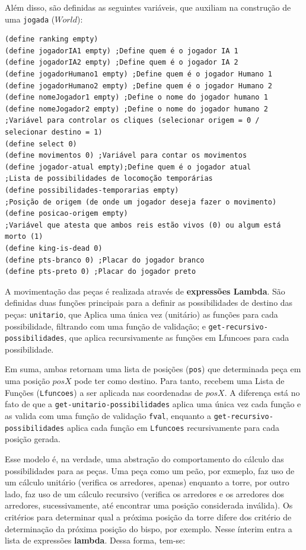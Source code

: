 Além disso, são definidas as seguintes variáveis, que auxiliam na construção de uma \verb|jogada| ($World$):
\begin{Verbatim}[fontsize=\footnotesize]
(define ranking empty)
(define jogadorIA1 empty) ;Define quem é o jogador IA 1
(define jogadorIA2 empty) ;Define quem é o jogador IA 2
(define jogadorHumano1 empty) ;Define quem é o jogador Humano 1
(define jogadorHumano2 empty) ;Define quem é o jogador Humano 2
(define nomeJogador1 empty) ;Define o nome do jogador humano 1
(define nomeJogador2 empty) ;Define o nome do jogador humano 2
;Variável para controlar os cliques (selecionar origem = 0 / selecionar destino = 1)
(define select 0)
(define movimentos 0) ;Variável para contar os movimentos
(define jogador-atual empty);Define quem é o jogador atual
;Lista de possibilidades de locomoção temporárias
(define possibilidades-temporarias empty)
;Posição de origem (de onde um jogador deseja fazer o movimento)
(define posicao-origem empty)
;Variável que atesta que ambos reis estão vivos (0) ou algum está morto (1)
(define king-is-dead 0)
(define pts-branco 0) ;Placar do jogador branco
(define pts-preto 0) ;Placar do jogador preto
\end{Verbatim}

A movimentação das peças é realizada através de \textbf{expressões Lambda}. São definidas duas funções
principais para a definir as possibilidades de destino das peças: \verb|unitario|, que
Aplica uma única vez (unitário) as funções para cada possibilidade, filtrando com uma função de validação; e
\verb|get-recursivo-possibilidades|, que aplica recursivamente as funções em Lfuncoes para cada possibilidade.

Em suma, ambas retornam uma lista de posições (\verb|pos|) que determinada peça em uma posição $posX$ pode ter como destino.
Para tanto, recebem uma Lista de Funções (\verb|Lfuncoes|) a ser aplicada nas coordenadas de $posX$. A diferença está no fato
de que a \verb|get-unitario-possibilidades| aplica uma única vez cada função e as valida com uma função de validação \verb|fval|,
enquanto a \verb|get-recursivo-possibilidades| aplica cada função em \verb|Lfuncoes| recursivamente para cada posição gerada.

Esse modelo é, na verdade, uma abstração do comportamento do cálculo das possibilidades para as peças. Uma peça como um peão, por exmeplo,
faz uso de um cálculo unitário (verifica os arredores, apenas) enquanto a torre, por outro lado, faz uso de um cálculo recursivo (verifica
os arredores e os arredores dos arredores, sucessivamente, até encontrar uma posição considerada inválida). Os critérios para determinar qual
a próxima posição da torre difere dos critério de determinação da próxima posição do bispo, por exemplo. Nesse ínterim entra a lista de expressões
\textbf{lambda}. Dessa forma, tem-se:


